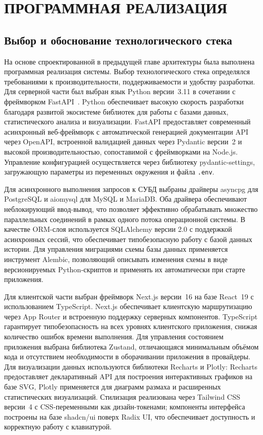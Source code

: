 \section{ПРОГРАММНАЯ РЕАЛИЗАЦИЯ}

\subsection{Выбор и обоснование технологического стека}

На основе спроектированной в предыдущей главе архитектуры была выполнена программная реализация системы. Выбор технологического стека определялся требованиями к производительности, поддерживаемости и удобству разработки. Для серверной части был выбран язык Python версии~3.11 в сочетании с фреймворком FastAPI~\cite{fastapi_docs}. Python обеспечивает высокую скорость разработки благодаря развитой экосистеме библиотек для работы с базами данных, статистического анализа и визуализации. FastAPI предоставляет современный асинхронный веб-фреймворк с автоматической генерацией документации API через OpenAPI, встроенной валидацией данных через Pydantic версии~2 и высокой производительностью, сопоставимой с фреймворками на Node.js. Управление конфигурацией осуществляется через библиотеку pydantic-settings, загружающую параметры из переменных окружения и файла \texttt{.env}.

Для асинхронного выполнения запросов к СУБД выбраны драйверы asyncpg для PostgreSQL и aiomysql для MySQL и MariaDB. Оба драйвера обеспечивают неблокирующий ввод-вывод, что позволяет эффективно обрабатывать множество параллельных соединений в рамках одного потока операционной системы. В качестве ORM-слоя используется SQLAlchemy версии 2.0 с поддержкой асинхронных сессий, что обеспечивает типобезопасную работу с базой данных истории. Для управления миграциями схемы базы данных применяется инструмент Alembic, позволяющий описывать изменения схемы в виде версионируемых Python-скриптов и применять их автоматически при старте приложения.

Для клиентской части выбран фреймворк Next.js версии~16 на базе React~19 с использованием TypeScript. Next.js обеспечивает клиентскую маршрутизацию через App Router и встроенную поддержку серверных компонентов. TypeScript гарантирует типобезопасность на всех уровнях клиентского приложения, снижая количество ошибок времени выполнения. Для управления состоянием приложения выбрана библиотека Zustand, отличающаяся минимальным объёмом кода и отсутствием необходимости в оборачивании приложения в провайдеры. Для визуализации данных используются библиотеки Recharts и Plotly: Recharts предоставляет декларативный API для построения интерактивных графиков на базе SVG, Plotly применяется для диаграмм размаха и расширенных статистических визуализаций. Стилизация реализована через Tailwind CSS версии~4 с CSS-переменными как дизайн-токенами; компоненты интерфейса построены на базе shadcn/ui поверх Radix UI, что обеспечивает доступность и корректную работу с клавиатурой.

